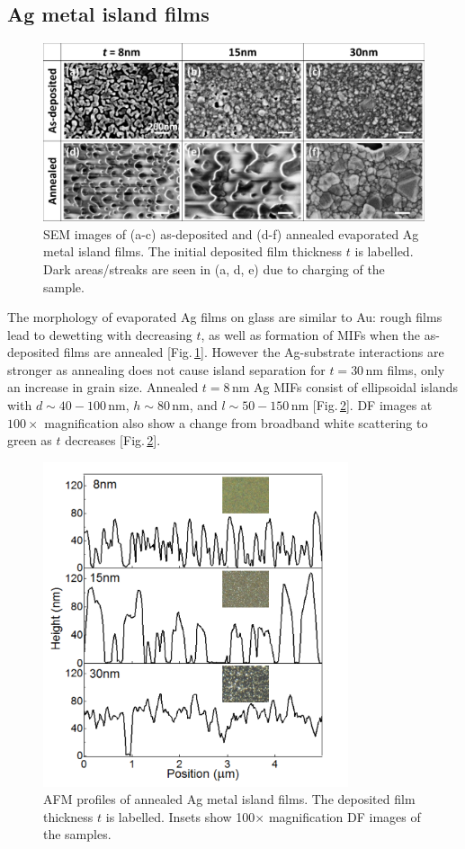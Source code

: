 \subsection{Ag metal island films}
\begin{figure}[h!] 
\centering    
\includegraphics[width=\textwidth]{Fig4}
\caption{SEM images of (a-c) as-deposited and (d-f) annealed evaporated Ag metal island films. The initial deposited film thickness $t$ is labelled. Dark areas/streaks are seen in (a, d, e) due to charging of the sample.}
\label{6Fig4}
\end{figure}
The morphology of evaporated Ag films on glass are similar to Au: rough films lead to dewetting with decreasing $t$, as well as formation of MIFs when the as-deposited films are annealed [Fig.\,\ref{6Fig4}]. However the Ag-substrate interactions are stronger as annealing does not cause island separation for $t=30$\,nm films, only an increase in grain size. Annealed $t=8$\,nm Ag MIFs consist of ellipsoidal islands with $d \sim40-100$\,nm, $h\sim80$\,nm, and $l\sim50-150$\,nm [Fig.\,\ref{6Fig5}]. DF images at $100\times$ magnification also show a change from broadband white scattering to green as $t$ decreases [Fig.\,\ref{6Fig5}]. 

\begin{figure}[h!] 
\centering    
\includegraphics[width=0.8\textwidth]{Fig5}
\caption{AFM profiles of annealed Ag metal island films. The deposited film thickness $t$ is labelled. Insets show 100$\times$ magnification DF images of the samples.}
\label{6Fig5}
\end{figure}

